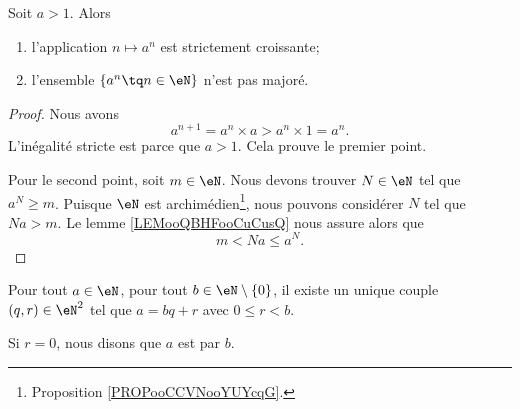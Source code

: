 \begin{proposition}
    Soit \( a>1\). Alors
    \begin{enumerate}
        \item
            l'application \( n\mapsto a^n\) est strictement croissante;
        \item
            l'ensemble \( \{ a^n\tq n\in \eN \}\) n'est pas majoré.
    \end{enumerate}
\end{proposition}

\begin{proof}
    Nous avons
    \begin{equation}
        a^{n+1}=a^n\times a>a^n\times 1=a^n.
    \end{equation}
    L'inégalité stricte est parce que \( a>1\). Cela prouve le premier point.

    Pour le second point, soit \( m\in \eN\). Nous devons trouver \( N\in \eN\) tel que \( a^N\geq m\). Puisque \( \eN\) est archimédien\footnote{Proposition \ref{PROPooCCVNooYUYcqG}.}, nous pouvons considérer \( N\) tel que \( Na>m\). Le lemme \ref{LEMooQBHFooCuCusQ} nous assure alors que
    \begin{equation}
        m<Na\leq a^N.
    \end{equation}
\end{proof}

\begin{theorem}       \label{THOooKDJVooRIJRHP}
    Pour tout \( a\in \eN\), pour tout \( b\in \eN\setminus\{ 0 \}\), il existe un unique couple \( (q,r)\in \eN^2\) tel que \( a=bq+r\) avec \( 0\leq r<b\).

    Si \( r=0\), nous disons que \( a\) est  par \( b\).
\end{theorem}

